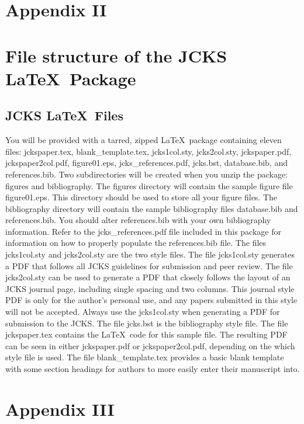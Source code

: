 \documentclass[12pt]{article}
\begin{document}
{}
{\clearpage}
\setcounter{equation}{0}%
\section{Appendix II}
\section{File structure of the JCKS \LaTeX\ Package}
\subsection{JCKS \LaTeX\ Files}
You will be provided with a tarred, zipped \LaTeX\ package containing eleven files: jckspaper.tex, blank\_template.tex, jcks1col.sty, jcks2col.sty, jckspaper.pdf, jckspaper2col.pdf, figure01.eps, jcks\_references.pdf, jcks.bst, database.bib, and references.bib.  Two subdirectories will be created when you unzip the package: figures and bibliography.  The figures directory will contain the sample figure file figure01.eps.  This directory should be used to store all your figure files.  The bibliography directory will contain the sample bibliography files database.bib and references.bib.  You should alter references.bib with your own bibliography information.  Refer to the jcks\_references.pdf file included in this package for information on how to properly populate the references.bib file. The files jcks1col.sty and jcks2col.sty are the two style files.  The file jcks1col.sty generates a PDF that follows all JCKS guidelines for submission and peer review.  The file jcks2col.sty can be used to generate a PDF that closely follows the layout of an JCKS journal page, including single spacing and two columns.  This journal style PDF is only for the author's personal use, and any papers submitted in this style will not be accepted.  Always use the jcks1col.sty when generating a PDF for submission to the JCKS. The file jcks.bst is the bibliography style file.  The file jckspaper.tex contains the \LaTeX\ code for this sample file.   The resulting PDF can be seen in either jckspaper.pdf or jckspaper2col.pdf, depending on the which style file is used. The file blank\_template.tex provides a basic blank template with some section headings for authors to more easily enter their manuscript into.

{}
{\clearpage}
\setcounter{equation}{0}%
\section{Appendix III}
\end{document}
